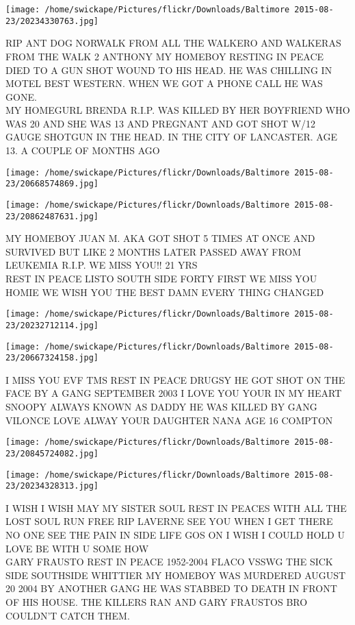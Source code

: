 \documentclass[10pt,letterpaper]{article}
\begin{document}
\vspace{0.25in}
\texttt{[image: /home/swickape/Pictures/flickr/Downloads/Baltimore 2015-08-23/20234330763.jpg]}

RIP ANT DOG NORWALK FROM ALL THE WALKERO AND WALKERAS FROM THE WALK  2 ANTHONY MY HOMEBOY RESTING IN PEACE DIED TO A GUN SHOT WOUND TO HIS HEAD.  HE WAS CHILLING IN MOTEL BEST WESTERN.  WHEN WE GOT A PHONE CALL HE WAS GONE.\\
MY HOMEGURL BRENDA R.I.P. WAS KILLED BY HER BOYFRIEND WHO WAS 20 AND SHE WAS 13 AND PREGNANT AND GOT SHOT W/12 GAUGE SHOTGUN IN THE HEAD.  IN THE CITY OF LANCASTER.  AGE 13.  A COUPLE OF MONTHS AGO
\pagebreak

\texttt{[image: /home/swickape/Pictures/flickr/Downloads/Baltimore 2015-08-23/20668574869.jpg]}

\vspace{0.25in}
\texttt{[image: /home/swickape/Pictures/flickr/Downloads/Baltimore 2015-08-23/20862487631.jpg]}

MY HOMEBOY JUAN M. AKA GOT SHOT 5 TIMES AT ONCE AND SURVIVED BUT LIKE 2 MONTHS LATER PASSED AWAY FROM LEUKEMIA R.I.P. WE MISS YOU!!  21 YRS\\
REST IN PEACE LISTO SOUTH SIDE FORTY FIRST WE MISS YOU HOMIE WE WISH YOU THE BEST DAMN EVERY THING CHANGED
\pagebreak

\texttt{[image: /home/swickape/Pictures/flickr/Downloads/Baltimore 2015-08-23/20232712114.jpg]}

\vspace{0.25in}
\texttt{[image: /home/swickape/Pictures/flickr/Downloads/Baltimore 2015-08-23/20667324158.jpg]}

I MISS YOU EVF TMS REST IN PEACE DRUGSY HE GOT SHOT ON THE FACE BY A GANG SEPTEMBER 2003 I LOVE YOU YOUR IN MY HEART\\
SNOOPY ALWAYS KNOWN AS DADDY HE WAS KILLED BY GANG VILONCE LOVE ALWAY YOUR DAUGHTER NANA AGE 16 COMPTON
\pagebreak

\texttt{[image: /home/swickape/Pictures/flickr/Downloads/Baltimore 2015-08-23/20845724082.jpg]}

\vspace{0.25in}
\texttt{[image: /home/swickape/Pictures/flickr/Downloads/Baltimore 2015-08-23/20234328313.jpg]}

I WISH I WISH MAY MY SISTER SOUL REST IN PEACES WITH ALL THE LOST SOUL RUN FREE RIP LAVERNE SEE YOU WHEN I GET THERE NO ONE SEE THE PAIN IN SIDE LIFE GOS ON I WISH I COULD HOLD U LOVE BE WITH U SOME HOW\\
GARY FRAUSTO REST IN PEACE 1952{-}2004 FLACO VSSWG THE SICK SIDE SOUTHSIDE WHITTIER MY HOMEBOY WAS MURDERED AUGUST 20 2004 BY ANOTHER GANG HE WAS STABBED TO DEATH IN FRONT OF HIS HOUSE.  THE KILLERS RAN AND GARY FRAUSTOS BRO COULDN'T CATCH THEM.
\pagebreak
\end{document}
